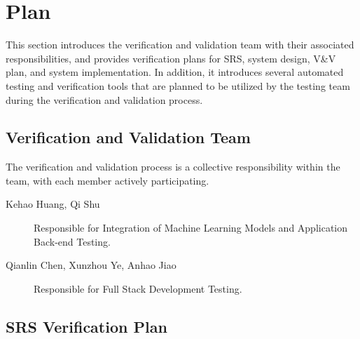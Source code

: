 \documentclass[12pt, titlepage]{article}
\begin{document}
\section{Plan}

This section introduces the verification and validation team with their
associated responsibilities, and provides verification plans for SRS, system
design, V\&V plan, and system implementation. In addition, it introduces several
automated testing and verification tools that are planned to be utilized by the
testing team during the verification and validation process.

\subsection{Verification and Validation Team}

The verification and validation process is a collective responsibility within
the team, with each member actively participating.

\begin{description}
\item[Kehao Huang, Qi Shu] Responsible for Integration of Machine Learning Models
  and Application Back-end Testing.
\item[Qianlin Chen, Xunzhou Ye, Anhao Jiao] Responsible for Full Stack Development
  Testing.
\end{description}

\subsection{SRS Verification Plan}
\end{document}

